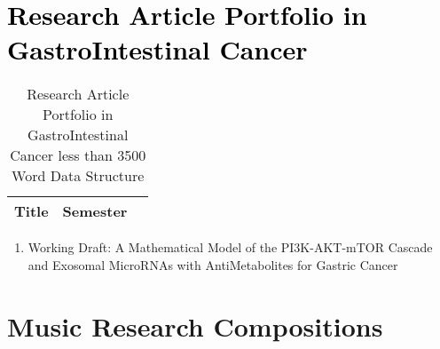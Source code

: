 \documentclass{TMLSStyleGuideResumeVitae}
\begin{document}

\section{\textcolor{black}{Research Article Portfolio in GastroIntestinal Cancer}}

\begin{table}[H]\footnotesize
\caption{Research Article Portfolio in GastroIntestinal Cancer less than 3500 Word Data Structure}	
\begin{tabular}{p{7cm}p{1cm}p{0.25cm}}
\hline
Title & Semester & \\   
\hline
\hline
\end{tabular}
\end{table}

\begin{enumerate}
\item Working Draft: A Mathematical Model of the PI3K-AKT-mTOR Cascade and Exosomal MicroRNAs with AntiMetabolites for Gastric Cancer
\end{enumerate}
\section{Music Research Compositions}
\end{document}
